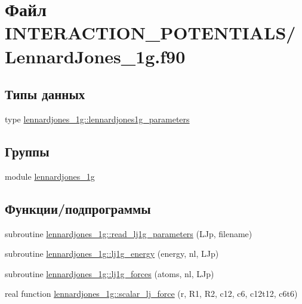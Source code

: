\hypertarget{_lennard_jones__1g_8f90}{}\section{Файл I\+N\+T\+E\+R\+A\+C\+T\+I\+O\+N\+\_\+\+P\+O\+T\+E\+N\+T\+I\+A\+L\+S/\+Lennard\+Jones\+\_\+1g.f90}
\label{_lennard_jones__1g_8f90}
\subsection*{Типы данных}
\begin{DoxyCompactItemize}
\item 
type \mbox{\hyperlink{structlennardjones__1g_1_1lennardjones1g__parameters}{lennardjones\+\_\+1g\+::lennardjones1g\+\_\+parameters}}
\end{DoxyCompactItemize}
\subsection*{Группы}
\begin{DoxyCompactItemize}
\item 
module \mbox{\hyperlink{namespacelennardjones__1g}{lennardjones\+\_\+1g}}
\end{DoxyCompactItemize}
\subsection*{Функции/подпрограммы}
\begin{DoxyCompactItemize}
\item 
subroutine \mbox{\hyperlink{namespacelennardjones__1g_aaf09aeeacdbe2a76adad336dde195938}{lennardjones\+\_\+1g\+::read\+\_\+lj1g\+\_\+parameters}} (L\+Jp, filename)
\item 
subroutine \mbox{\hyperlink{namespacelennardjones__1g_ad0b0c6184262c754f7daa91a179657ef}{lennardjones\+\_\+1g\+::lj1g\+\_\+energy}} (energy, nl, L\+Jp)
\item 
subroutine \mbox{\hyperlink{namespacelennardjones__1g_a2581bad1eb2a8f6b8ecaa6d09de8f226}{lennardjones\+\_\+1g\+::lj1g\+\_\+forces}} (atoms, nl, L\+Jp)
\item 
real function \mbox{\hyperlink{namespacelennardjones__1g_a3bf6806cd81693117d84cb3f91adc6d5}{lennardjones\+\_\+1g\+::scalar\+\_\+lj\+\_\+force}} (r, R1, R2, c12, c6, c12t12, c6t6)
\end{DoxyCompactItemize}
